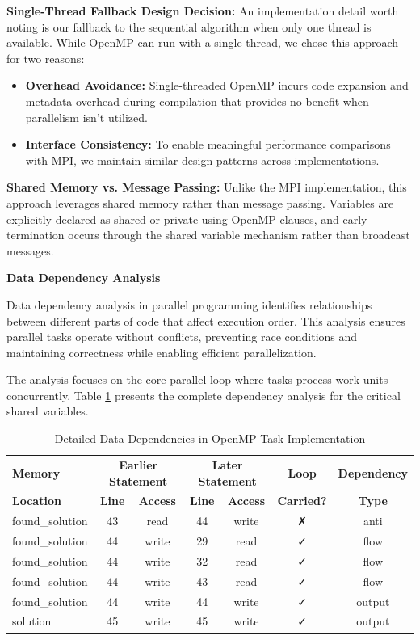 \begin{enumerate}
\textbf{Single-Thread Fallback Design Decision:}
An implementation detail worth noting is our fallback to the sequential algorithm when only one thread is available. While OpenMP can run with a single thread, we chose this approach for two reasons:
\begin{itemize}
    \item \textbf{Overhead Avoidance:} Single-threaded OpenMP incurs code expansion and metadata overhead during compilation that provides no benefit when parallelism isn't utilized.
    \item \textbf{Interface Consistency:} To enable meaningful performance comparisons with MPI, we maintain similar design patterns across implementations.
\end{itemize}

\textbf{Shared Memory vs. Message Passing:}
Unlike the MPI implementation, this approach leverages shared memory rather than message passing. Variables are explicitly declared as shared or private using OpenMP clauses, and early termination occurs through the shared variable mechanism rather than broadcast messages.

\textbf{Data Dependency Analysis}

Data dependency analysis in parallel programming identifies relationships between different parts of code that affect execution order. This analysis ensures parallel tasks operate without conflicts, preventing race conditions and maintaining correctness while enabling efficient parallelization.

The analysis focuses on the core parallel loop where tasks process work units concurrently. Table \ref{tab:omp_dependencies_detailed} presents the complete dependency analysis for the critical shared variables.

\begin{table}[htbp]
\caption{Detailed Data Dependencies in OpenMP Task Implementation}
\begin{center}
\small
\begin{tabular}{@{}lcccccc@{}}
\toprule
\textbf{Memory} & \multicolumn{2}{c}{\textbf{Earlier Statement}} & \multicolumn{2}{c}{\textbf{Later Statement}} & \textbf{Loop} & \textbf{Dependency} \\
\textbf{Location} & \textbf{Line} & \textbf{Access} & \textbf{Line} & \textbf{Access} & \textbf{Carried?} & \textbf{Type} \\
\midrule
found\_solution & 43 & read & 44 & write & ✗ & anti \\
found\_solution & 44 & write & 29 & read & ✓ & flow \\
found\_solution & 44 & write & 32 & read & ✓ & flow \\
found\_solution & 44 & write & 43 & read & ✓ & flow \\
found\_solution & 44 & write & 44 & write & ✓ & output \\
solution & 45 & write & 45 & write & ✓ & output \\
\bottomrule
\end{tabular}
\end{center}
\label{tab:omp_dependencies_detailed}
\end{table}


\end{enumerate}
